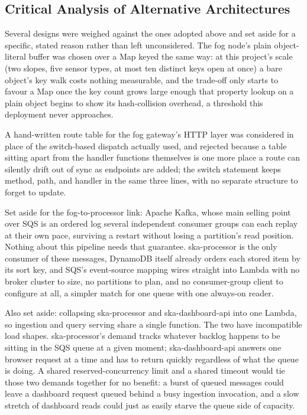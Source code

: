 \documentclass[conference]{IEEEtran}
\begin{document}
\subsection{Critical Analysis of Alternative Architectures}
Several designs were weighed against the ones adopted above and set aside for a specific, stated reason rather than left unconsidered. The fog node's plain object-literal buffer was chosen over a Map keyed the same way: at this project's scale (two slopes, five sensor types, at most ten distinct keys open at once) a bare object's key walk costs nothing measurable, and the trade-off only starts to favour a Map once the key count grows large enough that property lookup on a plain object begins to show its hash-collision overhead, a threshold this deployment never approaches.

A hand-written route table for the fog gateway's HTTP layer was considered in place of the switch-based dispatch actually used, and rejected because a table sitting apart from the handler functions themselves is one more place a route can silently drift out of sync as endpoints are added; the switch statement keeps method, path, and handler in the same three lines, with no separate structure to forget to update.

Set aside for the fog-to-processor link: Apache Kafka, whose main selling point over SQS is an ordered log several independent consumer groups can each replay at their own pace, surviving a restart without losing a partition's read position. Nothing about this pipeline needs that guarantee. ska-processor is the only consumer of these messages, DynamoDB itself already orders each stored item by its sort key, and SQS's event-source mapping wires straight into Lambda with no broker cluster to size, no partitions to plan, and no consumer-group client to configure at all, a simpler match for one queue with one always-on reader.

Also set aside: collapsing ska-processor and ska-dashboard-api into one Lambda, so ingestion and query serving share a single function. The two have incompatible load shapes. ska-processor's demand tracks whatever backlog happens to be sitting in the SQS queue at a given moment; ska-dashboard-api answers one browser request at a time and has to return quickly regardless of what the queue is doing. A shared reserved-concurrency limit and a shared timeout would tie those two demands together for no benefit: a burst of queued messages could leave a dashboard request queued behind a busy ingestion invocation, and a slow stretch of dashboard reads could just as easily starve the queue side of capacity.
\end{document}

